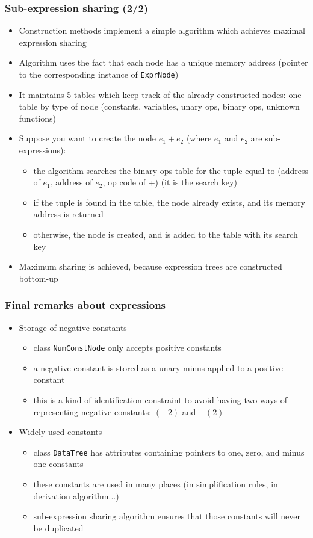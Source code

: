 \documentclass{beamer}
\begin{document}
\begin{frame}
  \frametitle{Sub-expression sharing (2/2)}
  \begin{itemize}
  \item Construction methods implement a simple algorithm which achieves maximal expression sharing
  \item Algorithm uses the fact that each node has a unique memory address (pointer to the corresponding instance of \texttt{ExprNode})
  \item It maintains 5 tables which keep track of the already constructed nodes: one table by type of node (constants, variables, unary ops, binary ops, unknown functions)
  \item Suppose you want to create the node $e_1+e_2$ (where $e_1$ and $e_2$ are sub-expressions):
    \begin{itemize}
    \item the algorithm searches the binary ops table for the tuple equal to (address of $e_1$, address of $e_2$, op code of +) (it is the \alert{search key})
    \item if the tuple is found in the table, the node already exists, and its memory address is returned
    \item otherwise, the node is created, and is added to the table with its search key
    \end{itemize}
  \item Maximum sharing is achieved, because expression trees are constructed bottom-up
  \end{itemize}
\end{frame}

\begin{frame}
  \frametitle{Final remarks about expressions}
  \begin{itemize}
  \item Storage of negative constants
    \begin{itemize}
    \item class \texttt{NumConstNode} only accepts positive constants
    \item a negative constant is stored as a unary minus applied to a positive constant
    \item this is a kind of identification constraint to avoid having two ways of representing negative constants: $(-2)$ and $-(2)$
    \end{itemize}
  \item Widely used constants
    \begin{itemize}
    \item class \texttt{DataTree} has attributes containing pointers to one, zero, and minus one constants
    \item these constants are used in many places (in simplification rules, in derivation algorithm...)
    \item sub-expression sharing algorithm ensures that those constants will never be duplicated
    \end{itemize}
  \end{itemize}
\end{frame}
\end{document}
